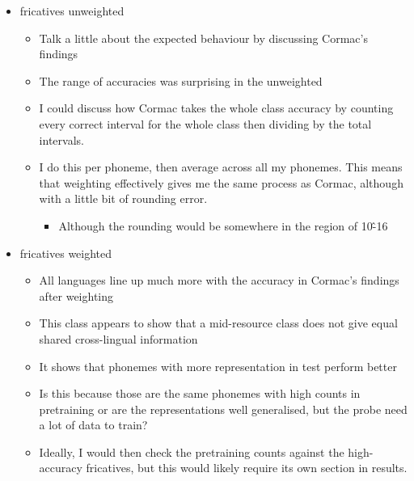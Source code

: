 \begin{itemize}
\begin{itemize}
        \item This would give English vowels an average interval count of 10M / 15 and Spanish vowels 14.8M / 5, meaning Spanish vowels would have far higher interval counts on average.
        \item I would expect the exact numbers to also be substantially higher for Spanish, this is reflected in the probe test data, which is taken from the same dataset.
    \end{itemize}
    \item fricatives unweighted
    \begin{itemize}
        \item Talk a little about the expected behaviour by discussing Cormac's findings \cite{english2022domain}
        \item The range of accuracies was surprising in the unweighted
        \item I could discuss how Cormac takes the whole class accuracy by counting every correct interval for the whole class then dividing by the total intervals.
        \item I do this per phoneme, then average across all my phonemes. This means that weighting effectively gives me the same process as Cormac, although with a little bit of rounding error. 
        \begin{itemize}
            \item Although the rounding would be somewhere in the region of 10\^-16
        \end{itemize}
    \end{itemize}
    \item fricatives weighted 
    \begin{itemize}
        \item All languages line up much more with the accuracy in Cormac's findings after weighting
        \item This class appears to show that a mid-resource class does not give equal shared cross-lingual information
        \item It shows that phonemes with more representation in test perform better
        \item Is this because those are the same phonemes with high counts in pretraining or are the representations well generalised, but the probe need a lot of data to train?
        \item Ideally, I would then check the pretraining counts against the high-accuracy fricatives, but this would likely require its own section in results.

\end{itemize}
\end{itemize}
